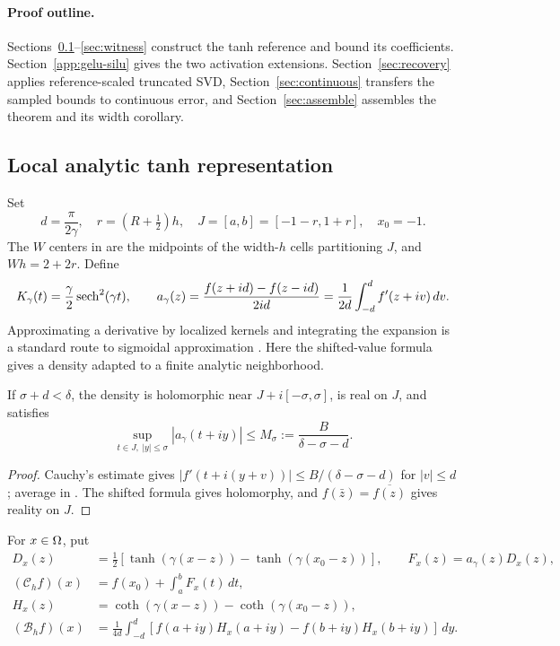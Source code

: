\paragraph{Proof outline.}
Sections~\ref{sec:local}--\ref{sec:witness} construct the tanh reference and
bound its coefficients. Section~\ref{app:gelu-silu} gives the two activation
extensions. Section~\ref{sec:recovery} applies reference-scaled truncated SVD,
Section~\ref{sec:continuous} transfers the sampled bounds to continuous error,
and Section~\ref{sec:assemble} assembles the theorem and its width corollary.

\subsection{Local analytic tanh representation}
\label{sec:local}
Set
\begin{equation}
 d=\frac\pi{2\gamma},\quad r=(R+\tfrac12)h,
 \quad J=[a,b]=[-1-r,1+r],\quad x_0=-1.
 \label{eq:local-geometry}
\end{equation}
The $W$ centers in  are the midpoints of the width-$h$
cells partitioning $J$, and $Wh=2+2r$. Define
\begin{equation}
 K_\gamma(t)=\frac\gamma2\operatorname{sech}^2(\gamma t),\qquad
 a_\gamma(z)=\frac{f(z+id)-f(z-id)}{2id}
            =\frac1{2d}\int_{-d}^d f'(z+iv)\,dv.
 \label{eq:density}
\end{equation}
Approximating a derivative by localized kernels and integrating the expansion
is a standard route to sigmoidal approximation
\cite{Costarelli2015Approximation,Buhmann_Jager_2022quasiinterpolation}.
Here the shifted-value formula gives a density adapted to a finite analytic
neighborhood.

\begin{lemma}
\label{lem:density}
If $\sigma+d<\delta$, the density is holomorphic near
$J+i[-\sigma,\sigma]$, is real on $J$, and satisfies
\begin{equation}
 \sup_{t\in J,\ |y|\le\sigma}|a_\gamma(t+iy)|
 \le M_\sigma:=\frac B{\delta-\sigma-d}.
 \label{eq:density-bound}
\end{equation}
\end{lemma}
\begin{proof}
Cauchy's estimate gives $|f'(t+i(y+v))|\le B/(\delta-\sigma-d)$ for
$|v|\le d$; average in . The shifted formula gives
holomorphy, and $f(\bar z)=\overline{f(z)}$ gives reality on $J$.
\end{proof}
For $x\in\Omega$, put
\begin{align}
 D_x(z)&=\tfrac12[\tanh(\gamma(x-z))-\tanh(\gamma(x_0-z))],
 \qquad F_x(z)=a_\gamma(z)D_x(z), \label{eq:D-F}\\
 (\mathcal C_h f)(x)&=f(x_0)+\int_a^bF_x(t)\,dt, \label{eq:Ch}\\
 H_x(z)&=\coth(\gamma(x-z))-\coth(\gamma(x_0-z)), \label{eq:Hx}\\
 (\mathcal B_hf)(x)&=\frac1{4d}\int_{-d}^d
 [f(a+iy)H_x(a+iy)-f(b+iy)H_x(b+iy)]\,dy. \label{eq:Bh}
\end{align}

